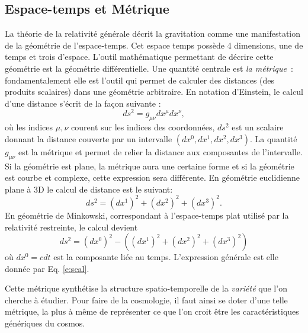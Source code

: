 \subsection{Espace-temps et Métrique}
La théorie de la relativité générale décrit la gravitation comme une manifestation de la géométrie de l'espace-temps. Cet espace temps possède 4 dimensions, une de temps et trois d'espace. L'outil mathématique permettant de décrire cette géométrie est la géométrie différentielle. Une quantité centrale est \textit{la métrique}~: fondamentalement elle est l'outil qui permet de calculer des distances (des produits scalaires) dans une géométrie arbitraire. En notation d'Einstein, le calcul d'une distance s'écrit de la façon suivante :
\begin{equation}
ds^2=g_{\mu\nu}dx^\mu dx^\nu,
\label{e:scal}
\end{equation}
où les indices $\mu,\nu$ courent sur les indices des coordonnées, $ds^2$ est un scalaire donnant la distance couverte par un intervalle $(dx^0,dx^1,dx^2,dx^3)$. La quantité $g_{\mu\nu}$ est la métrique et permet de relier la distance aux composantes de l'intervalle. Si la géométrie est plane, la métrique aura une certaine forme et si la géométrie est courbe et complexe, cette expression sera différente. En géométrie euclidienne plane à 3D le calcul de distance est le suivant:
\begin{equation}
ds^2=(dx^1)^2+(dx^2)^2+(dx^3)^2.
\end{equation} 
En géométrie de Minkowski, correspondant à l'espace-temps plat utilisé par la relativité restreinte, le calcul devient
\begin{equation}
ds^2=(dx^0)^2 -((dx^1)^2+(dx^2)^2+(dx^3)^2)
\end{equation} 
où $dx^0=cdt$ est la composante liée au temps. L'expression générale est elle donnée par Eq. \ref{e:scal}.

Cette métrique synthétise la structure spatio-temporelle de la \textit{variété} que l'on cherche à étudier. Pour faire de la cosmologie, il faut ainsi se doter d'une telle métrique, la plus à même de représenter ce que l'on croit être les caractéristiques génériques du cosmos.

